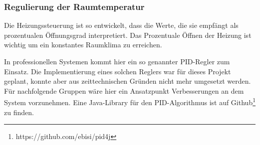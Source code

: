 \subsubsection{Regulierung der Raumtemperatur}
Die Heizungssteuerung ist so entwickelt, dass die Werte, die sie empfängt als prozentualen Öffnungsgrad interpretiert. Das Prozentuale Öffnen der Heizung ist wichtig um ein konstantes Raumklima zu erreichen. 

In professionellen Systemen kommt hier ein so genannter \ac{PID-Regler} zum Einsatz. Die Implementierung eines solchen Reglers war für dieses Projekt geplant, konnte aber aus zeittechnischen Gründen nicht mehr umgesetzt werden. Für nachfolgende Gruppen wäre hier ein Ansatzpunkt Verbesserungen an dem System vorzunehmen. Eine Java-Library für den PID-Algorithmus ist auf Github\footnote{https://github.com/ebisi/pid4j} zu finden.
